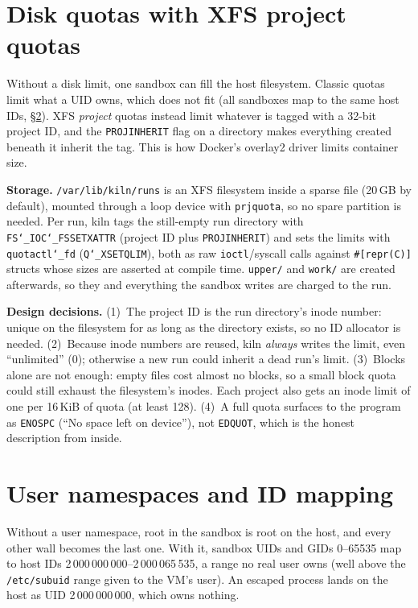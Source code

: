 \documentclass[10pt,letterpaper]{article}
\newcommand{\code}[1]{\texttt{#1}}
\newcommand{\us}{\char`\_}
\begin{document}
\section{Disk quotas with XFS project quotas}

Without a disk limit, one sandbox can fill the host filesystem. Classic quotas
limit what a UID owns, which does not fit (all sandboxes map to the same host IDs,
\S\ref{sec:userns}). XFS \emph{project} quotas instead limit whatever is tagged
with a 32-bit project ID, and the \code{PROJINHERIT} flag on a directory makes
everything created beneath it inherit the tag. This is how Docker's overlay2 driver
limits container size.

\textbf{Storage.} \code{/var/lib/kiln/runs} is an XFS filesystem inside a sparse
file (20\,GB by default), mounted through a loop device with \code{prjquota}, so no spare
partition is needed. Per run, kiln tags the still-empty run directory with
\code{FS\us{}IOC\us{}FSSETXATTR} (project ID plus \code{PROJINHERIT}) and sets the
limits with \code{quotactl\us{}fd} (\code{Q\us{}XSETQLIM}), both as raw
\code{ioctl}/syscall calls against \code{\#[repr(C)]} structs whose sizes are
asserted at compile time. \code{upper/} and \code{work/} are created afterwards,
so they and everything the sandbox writes are charged to the run.

\textbf{Design decisions.} (1)~The project ID is the run directory's inode
number: unique on the filesystem for as long as the directory exists, so no ID
allocator is needed. (2)~Because inode numbers are reused, kiln \emph{always}
writes the limit, even ``unlimited'' (0); otherwise a new run could inherit a
dead run's limit. (3)~Blocks alone are not enough: empty files cost almost no
blocks, so a small block quota could still exhaust the filesystem's inodes. Each
project also gets an inode limit of one per 16\,KiB of quota (at least 128).
(4)~A full quota surfaces to the program as \code{ENOSPC} (``No space left on
device''), not \code{EDQUOT}, which is the honest description from inside.

\section{User namespaces and ID mapping}
\label{sec:userns}

Without a user namespace, root in the sandbox is root on the host, and every
other wall becomes the last one. With it, sandbox UIDs and GIDs 0--65535 map to
host IDs 2\,000\,000\,000--2\,000\,065\,535, a range no real user owns (well above
the \code{/etc/subuid} range given to the VM's user). An escaped process lands on
the host as UID 2\,000\,000\,000, which owns nothing.
\end{document}
